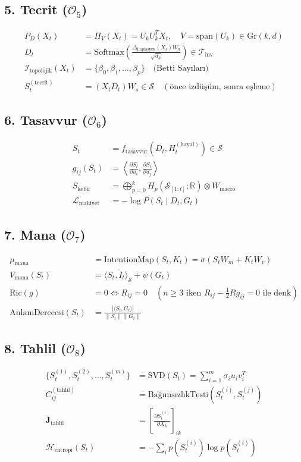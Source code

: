 \documentclass[11pt, a4paper]{article}
\begin{document}
\subsection{5. Tecrit ($\mathcal{O}_5$)}
\begin{align}
P_D(X_t) &= \Pi_V(X_t) = U_k U_k^T X_t, \quad V = \text{span}(U_k) \in \text{Gr}(k,d) \\
D_t &= \text{Softmax}\left( \frac{\Delta_{\text{Laplasyen}}(X_t) W_d}{\sqrt{d_k}} \right) \in \mathcal{T}_{\text{inv}} \\
\mathcal{I}_{\text{topolojik}}(X_t) &= \{ \beta_0, \beta_1, \dots, \beta_p \} \quad \text{(Betti Sayıları)} \\
S_t^{(\text{tecrit})} &= (X_t D_t) W_s \in \mathcal{S} \quad (\text{önce izdüşüm, sonra eşleme})
\end{align}

\subsection{6. Tasavvur ($\mathcal{O}_6$)}
\begin{align}
S_t &= f_{\text{tasavvur}}(D_t, H_t^{(\text{hayal})}) \in \mathcal{S} \\
g_{ij}(S_t) &= \left\langle \frac{\partial S_t}{\partial u_i}, \frac{\partial S_t}{\partial u_j} \right\rangle \\
S_{\text{kebîr}} &= \bigoplus_{p=0}^k H_p\left(\mathcal{S}_{[1:t]}; \mathbb{R}\right) \otimes W_{\text{macro}} \\
\mathcal{L}_{\text{mahiyet}} &= -\log P(S_t \mid D_t, G_t)
\end{align}

\subsection{7. Mana ($\mathcal{O}_7$)}
\begin{align}
\mu_{\text{mana}} &= \text{IntentionMap}(S_t, K_t) = \sigma(S_t W_m + K_t W_v) \\
V_{\text{mana}}(S_t) &= \langle S_t, \dot{I}_t \rangle_{\mathcal{S}} + \psi(G_t) \\
\text{Ric}(g) &= 0 \iff R_{ij} = 0 \quad (n \ge 3 \text{ iken } R_{ij} - \tfrac{1}{2}R g_{ij} = 0 \text{ ile denk}) \\
\text{AnlamDerecesi}(S_t) &= \frac{|\langle S_t, G_t \rangle|}{\|S_t\| \|G_t\|}
\end{align}

\subsection{8. Tahlil ($\mathcal{O}_8$)}
\begin{align}
\{S_t^{(1)}, S_t^{(2)}, \dots, S_t^{(m)}\} &= \text{SVD}(S_t) = \sum_{i=1}^m \sigma_i u_i v_i^T \\
C_{ij}^{(\text{tahlil})} &= \text{BağımsızlıkTesti}(S_t^{(i)}, S_t^{(j)}) \\
\mathbf{J}_{\text{tahlil}} &= \left[ \frac{\partial S_t^{(i)}}{\partial X_k} \right]_{ik} \\
\mathcal{H}_{\text{entropi}}(S_t) &= -\sum_{i} p(S_t^{(i)}) \log p(S_t^{(i)})
\end{align}
\end{document}
